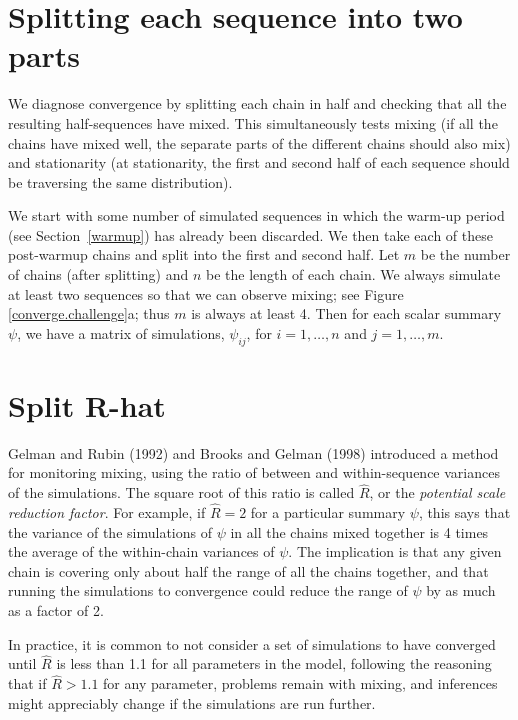 \documentclass[11pt]{article}
\begin{document}
\section{Splitting each sequence into two parts}

We diagnose convergence by splitting each chain in half and checking that all the resulting half-sequences have
mixed.  This simultaneously tests mixing (if all the chains have
mixed well, the separate parts of the different chains should also
mix) and stationarity (at stationarity, the first and second half of
each sequence should be traversing the same distribution).

We start with some number of simulated sequences in which the warm-up period (see Section~\ref{warmup}) has already been discarded.  We then take each of these post-warmup chains and split into the first and second half.  Let $m$ be the number of chains (after splitting) and $n$ be the length of each chain.  We always simulate at least two sequences so that we can observe mixing; see Figure \ref{converge.challenge}a; thus $m$ is always at least 4.  Then for each scalar summary $\psi$, we have a matrix of simulations, $\psi_{ij}$, for $i=1,\dots,n$ and $j=1,\ldots,m$.

\section{Split R-hat}\label{split}

Gelman and Rubin (1992) and Brooks and Gelman (1998) introduced a method for monitoring mixing, using the ratio of between and within-sequence variances of the simulations.  The square root of this ratio is called $\widehat{R}$, or the {\em potential scale reduction factor}.  For example, if $\widehat{R}=2$ for a particular summary $\psi$, this says that the variance of the simulations of $\psi$ in all the chains mixed together is 4 times the average of the within-chain variances of $\psi$.  The implication is that  any given chain is covering only about half the range of all the chains together, and that running the simulations to convergence could reduce the range of $\psi$ by as much as a factor of 2.

In practice, it is common to not consider a set of simulations to have converged until $\widehat{R}$ is less than 1.1 for all parameters in the model, following the reasoning that if $\widehat{R}>1.1$ for any parameter, problems remain with mixing, and inferences might appreciably change if the simulations are run further.
\end{document}
